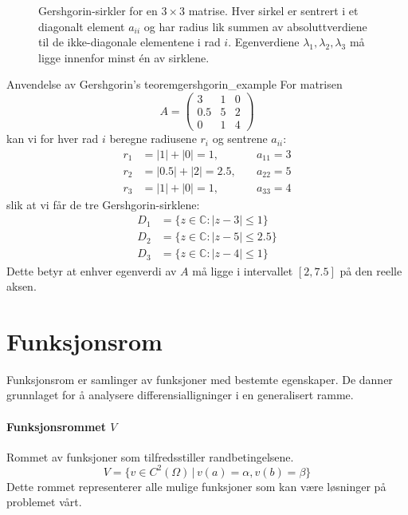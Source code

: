 \begin{figure}
	\centering
	
	\caption{Gershgorin-sirkler for en $3 \times 3$ matrise. Hver sirkel er sentrert i et diagonalt element $a_{ii}$ og har radius lik summen av absoluttverdiene til de ikke-diagonale elementene i rad $i$. Egenverdiene $\lambda_1, \lambda_2, \lambda_3$ må ligge innenfor minst én av sirklene.}
	\label{fig:gershgorin}
\end{figure}

\begin{example}{Anvendelse av Gershgorin's teorem}{gershgorin_example}
	For matrisen
	\[
		A = \begin{pmatrix} 3 & 1 & 0 \\ 0.5 & 5 & 2 \\ 0 & 1 & 4 \end{pmatrix}
	\]
	kan vi for hver rad $i$ beregne radiusene $r_i$ og sentrene $a_{ii}$:
	\begin{align*}
		r_1 & = |1| + |0| = 1,     & \quad a_{11} = 3 \\
		r_2 & = |0.5| + |2| = 2.5, & \quad a_{22} = 5 \\
		r_3 & = |1| + |0| = 1,     & \quad a_{33} = 4
	\end{align*}
	slik at vi får de tre Gershgorin-sirklene:
	\begin{align*}
		D_1 & = \{z \in \mathbb{C} : |z - 3| \leq 1\}   \\
		D_2 & = \{z \in \mathbb{C} : |z - 5| \leq 2.5\} \\
		D_3 & = \{z \in \mathbb{C} : |z - 4| \leq 1\}
	\end{align*}
	Dette betyr at enhver egenverdi av $A$ må ligge i intervallet $[2,7.5]$ på den reelle aksen.
\end{example}


\section{Funksjonsrom}
Funksjonsrom er samlinger av funksjoner med bestemte egenskaper. De danner grunnlaget for å analysere differensialligninger i en generalisert ramme.

\paragraph{Funksjonsrommet \(V\)} Rommet av funksjoner som tilfredsstiller randbetingelsene.
\[ V = \{ v \in C^2(\Omega) \, | \, v(a) = \alpha, v(b) = \beta \} \]
Dette rommet representerer alle mulige funksjoner som kan være løsninger på problemet vårt.

